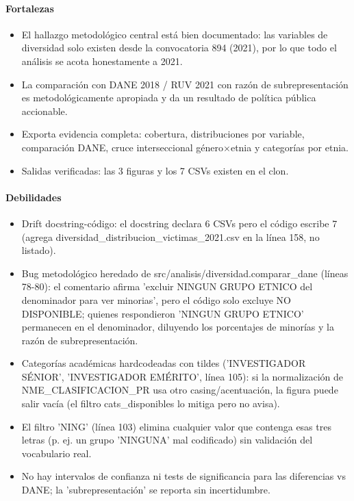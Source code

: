 \paragraph{Fortalezas}
\begin{itemize}
  \item El hallazgo metodológico central está bien documentado: las variables de diversidad solo existen desde la convocatoria 894 (2021), por lo que todo el análisis se acota honestamente a 2021.
  \item La comparación con DANE 2018 / RUV 2021 con razón de subrepresentación es metodológicamente apropiada y da un resultado de política pública accionable.
  \item Exporta evidencia completa: cobertura, distribuciones por variable, comparación DANE, cruce interseccional género$\times$etnia y categorías por etnia.
  \item Salidas verificadas: las 3 figuras y los 7 CSVs existen en el clon.
\end{itemize}

\paragraph{Debilidades}
\begin{itemize}
  \item Drift docstring-código: el docstring declara 6 CSVs pero el código escribe 7 (agrega diversidad\_distribucion\_victimas\_2021.csv en la línea 158, no listado).
  \item Bug metodológico heredado de src/analisis/diversidad.comparar\_dane (líneas 78-80): el comentario afirma 'excluir NINGUN GRUPO ETNICO del denominador para ver minorias', pero el código solo excluye NO DISPONIBLE; quienes respondieron 'NINGUN GRUPO ETNICO' permanecen en el denominador, diluyendo los porcentajes de minorías y la razón de subrepresentación.
  \item Categorías académicas hardcodeadas con tildes ('INVESTIGADOR SÉNIOR', 'INVESTIGADOR EMÉRITO', línea 105): si la normalización de NME\_CLASIFICACION\_PR usa otro casing/acentuación, la figura puede salir vacía (el filtro cats\_disponibles lo mitiga pero no avisa).
  \item El filtro 'NING' (línea 103) elimina cualquier valor que contenga esas tres letras (p. ej. un grupo 'NINGUNA' mal codificado) sin validación del vocabulario real.
  \item No hay intervalos de confianza ni tests de significancia para las diferencias vs DANE; la 'subrepresentación' se reporta sin incertidumbre.
\end{itemize}


